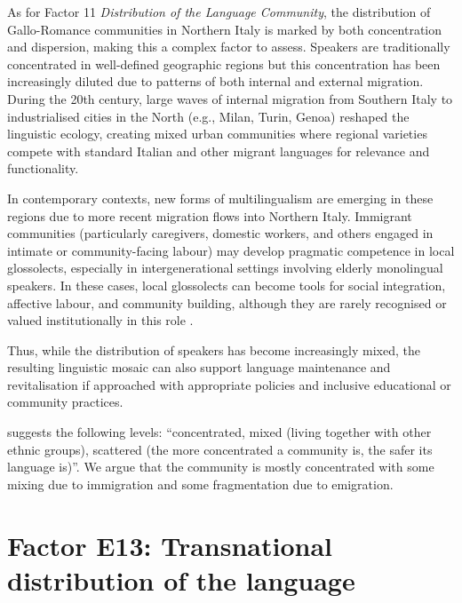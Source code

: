 \documentclass[a4paper,11pt]{article}
\begin{document}

As for Factor 11 \textit{Distribution of the Language Community}, the distribution of Gallo-Romance communities in Northern Italy is marked by both concentration and dispersion, making this a complex factor to assess. Speakers are traditionally concentrated in well-defined geographic regions but this concentration has been increasingly diluted due to patterns of both internal and external migration. During the 20th century, large waves of internal migration from Southern Italy to industrialised cities in the North (e.g., Milan, Turin, Genoa) reshaped the linguistic ecology, creating mixed urban communities where regional varieties compete with standard Italian and other migrant languages for relevance and functionality.

In contemporary contexts, new forms of multilingualism are emerging in these regions due to more recent migration flows into Northern Italy. Immigrant communities (particularly caregivers, domestic workers, and others engaged in intimate or community-facing labour) may develop pragmatic competence in local glossolects, especially in intergenerational settings involving elderly monolingual speakers. In these cases, local glossolects can become tools for social integration, affective labour, and community building, although they are rarely recognised or valued institutionally in this role \citep{dagostino2005nuove, lepschy2005standard, parry2005nonstandard}.

Thus, while the distribution of speakers has become increasingly mixed, the resulting linguistic mosaic can also support language maintenance and revitalisation if approached with appropriate policies and inclusive educational or community practices.

\citet[6]{unesco2011} suggests the following levels: ``concentrated, mixed (living together with other ethnic groups), scattered (the more concentrated a community is, the safer its language is)''. We argue that the community is mostly concentrated with some mixing due to immigration and some fragmentation due to emigration.

\section{Factor E13: Transnational distribution of the language}
\end{document}
